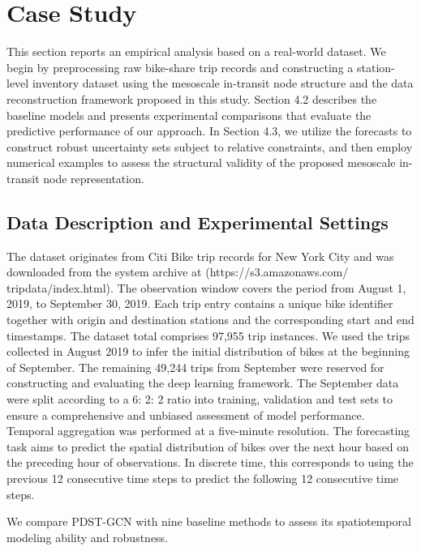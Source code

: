 \documentclass[preprint,12pt,authoryear]{elsarticle}
\begin{document}
\section{Case Study}

This section reports an empirical analysis based on a real-world dataset. We begin by preprocessing raw bike-share trip records and constructing a station-level inventory dataset using the mesoscale in-transit node structure and the data reconstruction framework proposed in this study. Section 4.2 describes the baseline models and presents experimental comparisons that evaluate the predictive performance of our approach. In Section 4.3, we utilize the forecasts to construct robust uncertainty sets subject to relative constraints, and then employ numerical examples to assess the structural validity of the proposed mesoscale in-transit node representation.

\subsection{Data Description and Experimental Settings}

The dataset originates from Citi Bike trip records for New York City and was downloaded from the system archive at (https://s3.amazonaws.com/ tripdata/index.html). The observation window covers the period from August 1, 2019, to September 30, 2019. Each trip entry contains a unique bike identifier together with origin and destination stations and the corresponding start and end timestamps. The dataset total comprises 97,955 trip instances. We used the trips collected in August 2019 to infer the initial distribution of bikes at the beginning of September. The remaining 49,244 trips from September were reserved for constructing and evaluating the deep learning framework. The September data were split according to a 6: 2: 2 ratio into training, validation and test sets to ensure a comprehensive and unbiased assessment of model performance. Temporal aggregation was performed at a five-minute resolution. The forecasting task aims to predict the spatial distribution of bikes over the next hour based on the preceding hour of observations. In discrete time, this corresponds to using the previous 12 consecutive time steps to predict the following 12 consecutive time steps.

We compare PDST-GCN with nine baseline methods to assess its spatiotemporal modeling ability and robustness.
\end{document}
